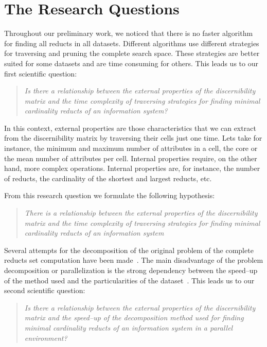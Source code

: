 \documentclass[11pt]{article}   %
\begin{document}
\section{The Research Questions}\label{ResearchQuestions} 
  Throughout our preliminary work, we noticed that there is no faster algorithm for finding all reducts in 
  all datasets. Different algorithms use different strategies for traversing and pruning the complete search 
  space. These strategies are better suited for some datasets and are time consuming for others. This leads 
  us to our first scientific question:
  
\begin{quote}
  \emph{Is there a relationship between the external properties of the discernibility matrix and the time 
  		complexity of traversing strategies for finding minimal cardinality reducts of an information
  		system?}
\end{quote}
  		
  In this context, external properties are those characteristics that we can extract from the discernibility
  matrix by traversing their cells just one time. Lets take for instance, the minimum and maximum number of
  attributes in a cell, the core or the mean number of attributes per cell. Internal properties require, on 
  the other hand, more complex operations. Internal properties are, for instance, the number of reducts, the
  cardinality of the shortest and largest reducts, etc.
  
  From this research question we formulate the following hypothesis:
  
\begin{quote}  
  \emph{There is a relationship between the external properties of the discernibility matrix and the time 
  		complexity of traversing strategies for finding minimal cardinality reducts of an information
  		system}
\end{quote}
  		
  Several attempts for the decomposition of the original problem of the complete reducts set computation have 
  been made~\cite{Strakowski08,Jiao10,Kopczynski14}. The main disadvantage of the problem decomposition or
  parallelization is the strong dependency between the speed--up of the method used and the particularities of 
  the dataset~\cite{Strakowski08}. This leads us to our second scientific question:
  
\begin{quote}
  \emph{Is there a relationship between the external properties of the discernibility matrix and the 
  		speed--up of the decomposition method used for finding minimal cardinality reducts of an information
  		system in a parallel environment?}
\end{quote}
\end{document}
